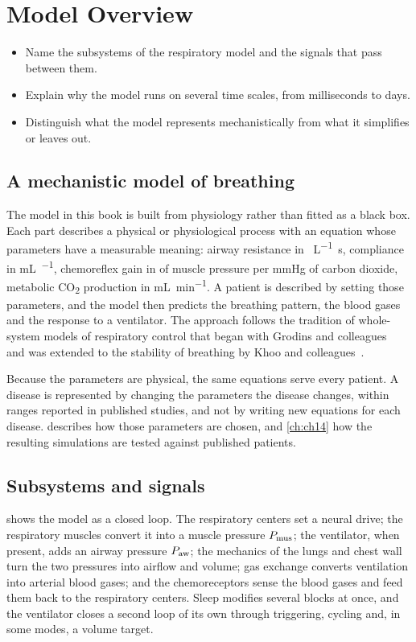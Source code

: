 \chapter{Model Overview}
\label{ch:ch02}

\begin{objectives}
\begin{itemize}[leftmargin=*]
  \item Name the subsystems of the respiratory model and the signals that pass between them.
  \item Explain why the model runs on several time scales, from milliseconds to days.
  \item Distinguish what the model represents mechanistically from what it simplifies or leaves out.
\end{itemize}
\end{objectives}

\section{A mechanistic model of breathing}
\label{sec:overview-mechanistic}
The model in this book is built from physiology rather than fitted as a black box. Each part describes a physical or physiological process with an equation whose parameters have a measurable meaning: airway resistance in \si{\cmH\per\liter\second}, compliance in \si{\milli\liter\per\cmH}, chemoreflex gain in \si{\cmH} of muscle pressure per \si{\mmHg} of carbon dioxide, metabolic CO\textsubscript{2} production in \si{\milli\liter\per\minute}. A patient is described by setting those parameters, and the model then predicts the breathing pattern, the blood gases and the response to a ventilator. The approach follows the tradition of whole-system models of respiratory control that began with Grodins and colleagues~\citep{grodins1967} and was extended to the stability of breathing by Khoo and colleagues~\citep{khoo1982}.

Because the parameters are physical, the same equations serve every patient. A disease is represented by changing the parameters the disease changes, within ranges reported in published studies, and not by writing new equations for each disease.  describes how those parameters are chosen, and \cref{ch:ch14} how the resulting simulations are tested against published patients.

\section{Subsystems and signals}
\label{sec:overview-blocks}
 shows the model as a closed loop. The respiratory centers set a neural drive; the respiratory muscles convert it into a muscle pressure $P_{\mathrm{mus}}$; the ventilator, when present, adds an airway pressure $P_{\mathrm{aw}}$; the mechanics of the lungs and chest wall turn the two pressures into airflow and volume; gas exchange converts ventilation into arterial blood gases; and the chemoreceptors sense the blood gases and feed them back to the respiratory centers. Sleep modifies several blocks at once, and the ventilator closes a second loop of its own through triggering, cycling and, in some modes, a volume target.

